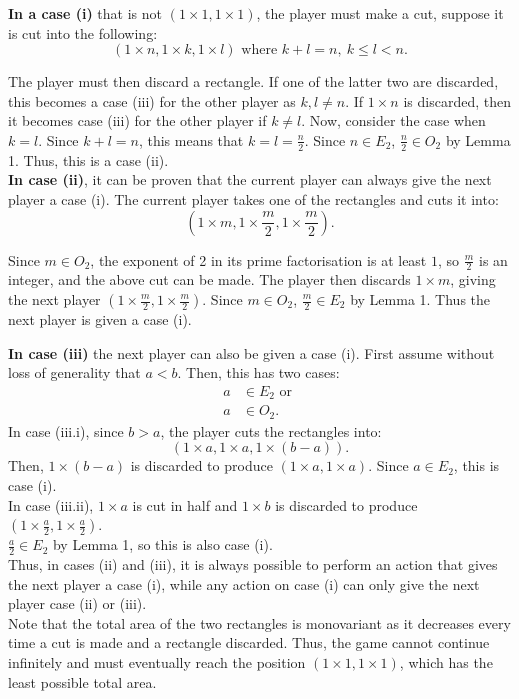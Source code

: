 \documentclass{article}
\begin{document}
\textbf{In a case (i)} that is not $(1 \times 1, 1 \times 1)$, the player must make a cut, suppose it is cut into the following:
$$ (1 \times n, 1 \times k, 1 \times l) \text{ where } k + l = n,\ k \le l < n.$$

The player must then discard a rectangle. If one of the latter two are discarded, this becomes a case (iii) for the other player as $k,l \neq n$. If $1 \times n$ is discarded, then it becomes case (iii) for the other player if $k\neq l$. Now, consider the case when $k = l$. Since $k + l = n$, this means that $k = l = \frac{n}{2}.$ Since $n \in E_2$, $\frac{n}2 \in O_2$ by Lemma 1. Thus, this is a case (ii). \\

\textbf{In case (ii)}, it can be proven that the current player can always give the next player a case (i). The current player takes one of the rectangles and cuts it into:
$$ \left( 1 \times m, 1 \times \frac{m}2, 1 \times \frac{m}2 \right).$$

Since $m \in O_2$, the exponent of 2 in its prime factorisation is at least $1$, so $\frac{m}2$ is an integer, and the above cut can be made. The player then discards $1 \times m$, giving the next player $\left( 1 \times \frac{m}2, 1 \times \frac{m}2 \right)$. Since $m \in O_2$, $\frac{m}2 \in E_2$ by Lemma 1. Thus the next player is given a case (i).

\newpage

\textbf{In case (iii)} the next player can also be given a case (i). First assume without loss of generality that $a < b$. Then, this has two cases:
\begin{align*}
    a &\in E_2 \text{ or } \tag{iii.i} \\
    a &\in O_2. \tag{iii.ii}
\end{align*}
In case (iii.i), since $b>a$, the player cuts the rectangles into:
$$ (1 \times a, 1 \times a, 1 \times (b-a)).$$
Then, $1 \times (b-a)$ is discarded to produce $(1 \times a, 1 \times a)$. Since $a \in E_2$, this is case (i). \\

In case (iii.ii),  $1\times a$ is cut in half and $1\times b$ is discarded to produce $(1 \times \frac{a}2, 1 \times \frac{a}2)$. \\
$\frac{a}2 \in E_2$ by Lemma 1, so this is also case (i). \\

Thus, in cases (ii) and (iii), it is always possible to perform an action that gives the next player a case (i), while any action on case (i) can only give the next player case (ii) or (iii). \\
Note that the total area of the two rectangles is monovariant as it decreases every time a cut is made and a rectangle discarded. Thus, the game cannot continue infinitely and must eventually reach the position $(1 \times 1, 1 \times 1)$, which has the least possible total area. \\
\end{document}
